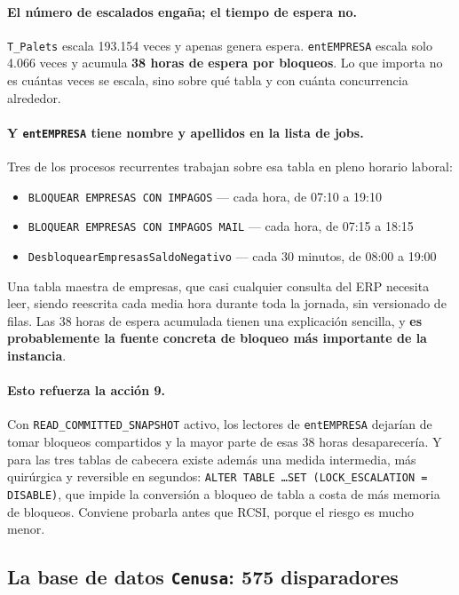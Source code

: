\documentclass[11pt,a4paper]{article}
\newcommand{\cod}[1]{\texttt{\small #1}}
\begin{document}
\paragraph{El número de escalados engaña; el tiempo de espera no.}
\cod{T\_Palets} escala 193.154 veces y apenas genera espera.
\cod{entEMPRESA} escala solo 4.066 veces y acumula \textbf{38 horas de espera
por bloqueos}. Lo que importa no es cuántas veces se escala, sino sobre qué
tabla y con cuánta concurrencia alrededor.

\paragraph{Y \cod{entEMPRESA} tiene nombre y apellidos en la lista de jobs.}
Tres de los procesos recurrentes trabajan sobre esa tabla en pleno horario
laboral:

\begin{itemize}\itemsep1pt
  \item \cod{BLOQUEAR EMPRESAS CON IMPAGOS} — cada hora, de 07:10 a 19:10
  \item \cod{BLOQUEAR EMPRESAS CON IMPAGOS MAIL} — cada hora, de 07:15 a 18:15
  \item \cod{DesbloquearEmpresasSaldoNegativo} — cada 30 minutos, de 08:00 a 19:00
\end{itemize}

Una tabla maestra de empresas, que casi cualquier consulta del ERP necesita
leer, siendo reescrita cada media hora durante toda la jornada, sin versionado
de filas. Las 38 horas de espera acumulada tienen una explicación sencilla, y
\textbf{es probablemente la fuente concreta de bloqueo más importante de la
instancia}.

\paragraph{Esto refuerza la acción 9.} Con \cod{READ\_COMMITTED\_SNAPSHOT}
activo, los lectores de \cod{entEMPRESA} dejarían de tomar bloqueos
compartidos y la mayor parte de esas 38 horas desaparecería. Y para las tres
tablas de cabecera existe además una medida intermedia, más quirúrgica y
reversible en segundos:
\cod{ALTER TABLE \ldots SET (LOCK\_ESCALATION = DISABLE)}, que impide la
conversión a bloqueo de tabla a costa de más memoria de bloqueos. Conviene
probarla antes que RCSI, porque el riesgo es mucho menor.

\subsection{La base de datos \cod{Cenusa}: 575 disparadores}
\end{document}
